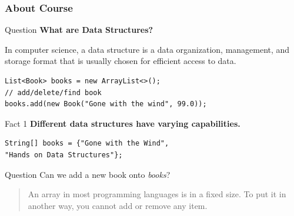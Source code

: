 \documentclass[aspectratio=169, 14pt]{beamer}
\begin{document}


\begin{frame}[fragile]
\frametitle{About Course}
\begin{exampleblock}{Question}
\textbf{What are \alert{Data Structures}?}
\end{exampleblock}
\pause
\begin{displayquote}
    In computer science, a data structure is a data organization, management, and storage format that is usually chosen for efficient access to data.
\end{displayquote}

\pause

\begin{verbatim}
List<Book> books = new ArrayList<>();
// add/delete/find book
books.add(new Book("Gone with the wind", 99.0));
\end{verbatim}

\end{frame}

\begin{frame}[fragile]
    \begin{block}{Fact 1}
        \textbf{Different data structures have varying \alert{capabilities}.}
    \end{block}
    \begin{verbatim}
String[] books = {"Gone with the Wind", 
"Hands on Data Structures"};
    \end{verbatim} 
   \begin{exampleblock}{Question}
    Can we add a new book onto \emph{books}?
    \end{exampleblock} 
\pause
    \begin{quote}
An array in most programming languages is in a fixed size. To put it in another way, you cannot add or remove any item.
    \end{quote}
\end{frame}
\end{document}
